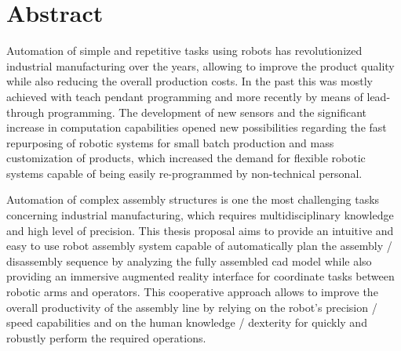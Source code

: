 \chapter*{Abstract}

Automation of simple and repetitive tasks using robots has revolutionized industrial manufacturing over the years, allowing to improve the product quality while also reducing the overall production costs. In the past this was mostly achieved with teach pendant programming and more recently by means of lead-through programming. The development of new sensors and the significant increase in computation capabilities opened new possibilities regarding the fast repurposing of robotic systems for small batch production and mass customization of products, which increased the demand for flexible robotic systems capable of being easily re-programmed by non-technical personal.

Automation of complex assembly structures is one the most challenging tasks concerning industrial manufacturing, which requires multidisciplinary knowledge and high level of precision. This thesis proposal aims to provide an intuitive and easy to use robot assembly system capable of automatically plan the assembly / disassembly sequence by analyzing the fully assembled \gls{cad} model while also providing an immersive augmented reality interface for coordinate tasks between robotic arms and operators. This cooperative approach  allows to improve the overall productivity of the assembly line by relying on the robot's precision / speed capabilities and on the human knowledge / dexterity for quickly and robustly perform the required operations.
